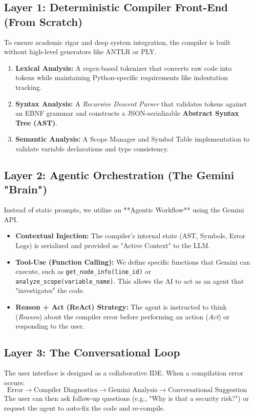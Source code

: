 \documentclass[a4paper,12pt]{article}
\begin{document}
\subsection{Layer 1: Deterministic Compiler Front-End (From Scratch)}
To ensure academic rigor and deep system integration, the compiler is built without high-level generators like ANTLR or PLY. 
\begin{enumerate}
    \item \textbf{Lexical Analysis:} A regex-based tokenizer that converts raw code into tokens while maintaining Python-specific requirements like indentation tracking.
    \item \textbf{Syntax Analysis:} A \textit{Recursive Descent Parser} that validates tokens against an EBNF grammar and constructs a JSON-serializable \textbf{Abstract Syntax Tree (AST)}.
    \item \textbf{Semantic Analysis:} A Scope Manager and Symbol Table implementation to validate variable declarations and type consistency.
\end{enumerate}

\subsection{Layer 2: Agentic Orchestration (The Gemini "Brain")}
Instead of static prompts, we utilize an **Agentic Workflow** using the Gemini API. 
\begin{itemize}
    \item \textbf{Contextual Injection:} The compiler’s internal state (AST, Symbols, Error Logs) is serialized and provided as "Active Context" to the LLM.
    \item \textbf{Tool-Use (Function Calling):} We define specific functions that Gemini can execute, such as \texttt{get\_node\_info(line\_id)} or \texttt{analyze\_scope(variable\_name)}. This allows the AI to act as an agent that "investigates" the code.
    \item \textbf{Reason + Act (ReAct) Strategy:} The agent is instructed to think (\textit{Reason}) about the compiler error before performing an action (\textit{Act}) or responding to the user.
\end{itemize}

\subsection{Layer 3: The Conversational Loop}
The user interface is designed as a collaborative IDE. When a compilation error occurs:
\begin{equation}
    \text{Error} \rightarrow \text{Compiler Diagnostics} \rightarrow \text{Gemini Analysis} \rightarrow \text{Conversational Suggestion}
\end{equation}
The user can then ask follow-up questions (e.g., "Why is that a security risk?") or request the agent to auto-fix the code and re-compile.
\end{document}

